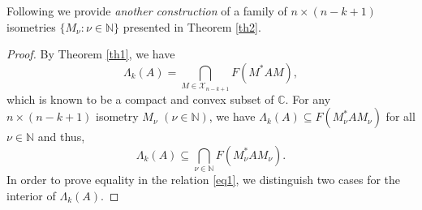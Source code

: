 \documentclass[12pt, reqno]{amsart}
\theoremstyle{definition}
\theoremstyle{remark}
\numberwithin{equation}{section}
\begin{document}
Following we provide \textit{another construction} of a family of $n\times(n-k+1)$ isometries $\{M_{\nu}: \nu\in\mathbb{N}\}$ presented in Theorem \ref{th2}.
\begin{proof}
By Theorem \ref{th1}, we have
\begin{equation}\label{eq0}
\Lambda_{k}(A)=\bigcap_{M\in\mathcal{X}_{n-k+1}}F(M^{*}AM),
\end{equation}
which is known to be a compact and convex subset  of $\mathbb{C}$. For any $n\times(n-k+1)$ isometry $M_{\nu}$ $(\nu\in\mathbb{N})$, we have $\Lambda_{k}(A)\subseteq F(M_{\nu}^{*}AM_{\nu})$ for all $\nu\in\mathbb{N}$ and thus,
\begin{equation}\label{eq1}
\Lambda_{k}(A)\subseteq\bigcap_{\nu\in\mathbb{N}}F(M_{\nu}^{*}AM_{\nu}).
\end{equation}
In order to prove equality in the relation \eqref{eq1}, we  distinguish two cases for the interior of $\Lambda_{k}(A)$.


\end{proof}
\end{document}
